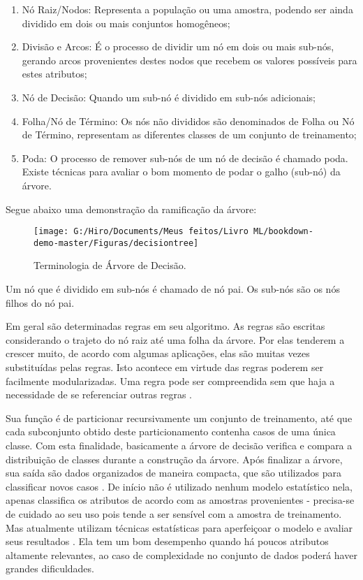 \documentclass[
  openany]{book}
\begin{document}
\begin{enumerate}
\def\labelenumi{\arabic{enumi}.}
\item
  Nó Raiz/Nodos: Representa a população ou uma amostra, podendo ser ainda dividido em dois ou mais conjuntos homogêneos;
\item
  Divisão e Arcos: É o processo de dividir um nó em dois ou mais sub-nós, gerando arcos provenientes destes nodos que recebem os valores possíveis para estes atributos;
\item
  Nó de Decisão: Quando um sub-nó é dividido em sub-nós adicionais;
\item
  Folha/Nó de Término: Os nós não divididos são denominados de Folha ou Nó de Término, representam as diferentes classes de um conjunto de treinamento;
\item
  Poda: O processo de remover sub-nós de um nó de decisão é chamado poda. Existe técnicas para avaliar o bom momento de podar o galho (sub-nó) da árvore.
\end{enumerate}

Segue abaixo uma demonstração da ramificação da árvore:

\begin{figure}

{\centering \texttt{[image: G:/Hiro/Documents/Meus feitos/Livro ML/bookdown-demo-master/Figuras/decisiontree]} 

}

\caption{Terminologia de Árvore de Decisão.}\label{fig:decisiontree}
\end{figure}



Um nó que é dividido em sub-nós é chamado de nó pai. Os sub-nós são os nós filhos do nó pai.

Em geral são determinadas regras em seu algoritmo. As regras são escritas considerando o trajeto do nó raiz até uma folha da árvore. Por elas tenderem a crescer muito, de acordo com algumas aplicações, elas são muitas vezes substituídas pelas regras. Isto acontece em virtude das regras poderem ser facilmente modularizadas. Uma regra pode ser compreendida sem que haja a necessidade de se referenciar outras regras \citep{ingargiola1996building}.

Sua função é de particionar recursivamente um conjunto de treinamento, até que cada subconjunto obtido deste particionamento contenha casos de uma única classe. Com esta finalidade, basicamente a árvore de decisão verifica e compara a distribuição de classes durante a construção da árvore. Após finalizar a árvore, sua saída são dados organizados de maneira compacta, que são utilizados para classificar novos casos \citep{holsheimer1994data}. De início não é utilizado nenhum modelo estatístico nela, apenas classifica os atributos de acordo com as amostras provenientes - precisa-se de cuidado ao seu uso pois tende a ser sensível com a amostra de treinamento. Mas atualmente utilizam técnicas estatísticas para aperfeiçoar o modelo e avaliar seus resultados \citep{shiba2005classificaccao}. Ela tem um bom desempenho quando há poucos atributos altamente relevantes, ao caso de complexidade no conjunto de dados poderá haver grandes dificuldades.
\end{document}
